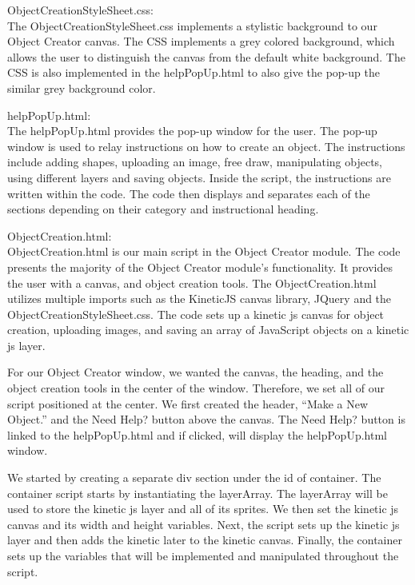 \documentclass[a4paper, 11pt]{article} %
\begin{document}
ObjectCreationStyleSheet.css:\\

The ObjectCreationStyleSheet.css implements a stylistic background to our Object Creator canvas. The CSS implements a grey colored background, which allows the user to distinguish the canvas from the default white background. The CSS is also implemented in the helpPopUp.html to also give the pop-up the similar grey background color. 

helpPopUp.html:\\

The helpPopUp.html provides the pop-up window for the user. The pop-up window is used to relay instructions on how to create an object. The instructions include adding shapes, uploading an image, free draw, manipulating objects, using different layers and saving objects. Inside the script, the instructions are written within the code. The code then displays and separates each of the sections depending on their category and instructional heading.

ObjectCreation.html:\\

ObjectCreation.html is our main script in the Object Creator module. The code presents the majority of the Object Creator module’s functionality. It provides the user with a canvas, and object creation tools. The ObjectCreation.html utilizes multiple imports such as the KineticJS canvas library, JQuery and the ObjectCreationStyleSheet.css. The code sets up a kinetic js canvas for object creation, uploading images, and saving an array of JavaScript objects on a kinetic js layer.   

For our Object Creator window, we wanted the canvas, the heading, and the object creation tools in the center of the window. Therefore, we set all of our script positioned at the center. We first created the header, “Make a New Object.” and the Need Help? button above the canvas. The Need Help? button is linked to the helpPopUp.html and if clicked, will display the helpPopUp.html window.   

We started by creating a separate div section under the id of container. The container script starts by instantiating the layerArray. The layerArray will be used to store the kinetic js layer and all of its sprites. We then set the kinetic js canvas and its width and height variables. Next, the script sets up the kinetic js layer and then adds the kinetic later to the kinetic canvas. Finally, the container sets up the variables that will be implemented and manipulated throughout the script.
\end{document}
